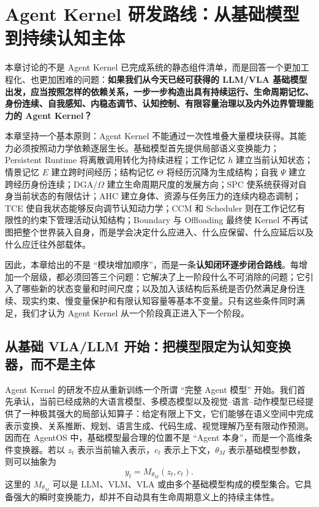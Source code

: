 \chapter{Agent Kernel 研发路线：从基础模型到持续认知主体}
\label{chap:agent-kernel-roadmap}

\begin{chapterlead}
本章讨论的不是 Agent Kernel 已完成系统的静态组件清单，而是回答一个更加工程化、也更加困难的问题：\textbf{如果我们从今天已经可获得的 LLM/VLA 基础模型出发，应当按照怎样的依赖关系，一步一步构造出具有持续运行、生命周期记忆、身份连续、自我感知、内稳态调节、认知控制、有限容量治理以及内外边界管理能力的 Agent Kernel？}

本章坚持一个基本原则：Agent Kernel 不能通过一次性堆叠大量模块获得。其能力必须按照动力学依赖逐层生长。基础模型首先提供局部语义变换能力；Persistent Runtime 将离散调用转化为持续进程；工作记忆 $h$ 建立当前认知状态；情景记忆 $E$ 建立跨时间经历；结构记忆 $\Theta$ 将经历沉降为生成结构；自我 $\Psi$ 建立跨经历身份连续；DGA/$\Omega$ 建立生命周期尺度的发展方向；SPC 使系统获得对自身当前状态的有限估计；AHC 建立身体、资源与任务压力的连续内稳态调制；TCE 使自我状态能够反向调节认知动力学；CCM 和 Scheduler 则在工作记忆有限性的约束下管理活动认知结构；Boundary 与 Offloading 最终使 Kernel 不再试图把整个世界装入自身，而是学会决定什么应进入、什么应保留、什么应延后以及什么应迁往外部载体。

因此，本章给出的不是 ``模块增加顺序''，而是一条\textbf{认知闭环逐步闭合路线}。每增加一个层级，都必须回答三个问题：它解决了上一阶段什么不可消除的问题；它引入了哪些新的状态变量和时间尺度；以及加入该结构后系统是否仍然满足身份连续、现实约束、慢变量保护和有限认知容量等基本不变量。只有这些条件同时满足，我们才认为 Agent Kernel 从一个阶段真正进入下一个阶段。
\end{chapterlead}

\section{从基础 VLA/LLM 开始：把模型限定为认知变换器，而不是主体}

Agent Kernel 的研发不应从重新训练一个所谓 ``完整 Agent 模型'' 开始。我们首先承认，当前已经成熟的大语言模型、多模态模型以及视觉--语言--动作模型已经提供了一种极其强大的局部认知算子：给定有限上下文，它们能够在语义空间中完成表示变换、关系推断、规划、语言生成、代码生成、视觉理解乃至有限动作预测。因而在 AgentOS 中，基础模型最合理的位置不是 ``Agent 本身''，而是一个高维条件变换器。若以 $z_t$ 表示当前输入表示，$c_t$ 表示上下文，$\theta_M$ 表示基础模型参数，则可以抽象为
\[
y_t = M_{\theta_M}(z_t,c_t).
\]
这里的 $M_{\theta_M}$ 可以是 LLM、VLM、VLA 或由多个基础模型构成的模型集合。它具备强大的瞬时变换能力，却并不自动具有生命周期意义上的持续主体性。

